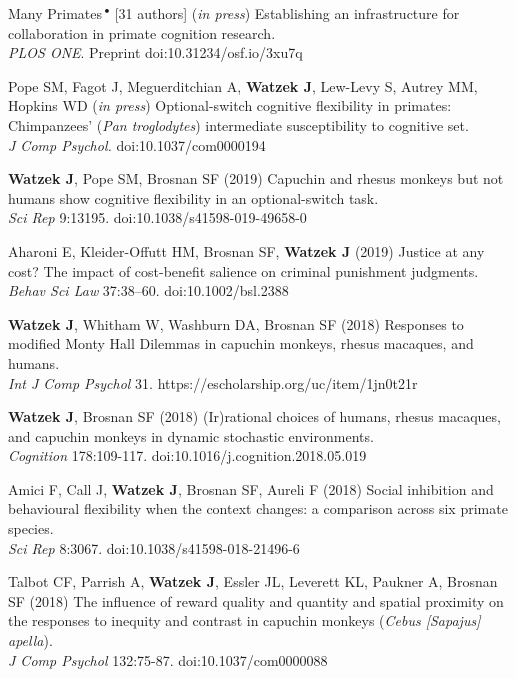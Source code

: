 \documentclass[]{friggeri-cv}
\begin{document}
\begin{enumerate}[label={[\,\arabic*\,]}]
  \item {Many Primates\,${}^\bullet$ [31 authors] (\emph{in press}) Establishing an infrastructure for collaboration in primate cognition research. \\\emph{PLOS ONE}. Preprint doi:10.31234/osf.io/3xu7q}
  \item {Pope SM, Fagot J, Meguerditchian A, \textbf{Watzek J}, Lew-Levy S, Autrey MM, Hopkins WD (\emph{in press}) Optional-switch cognitive flexibility in primates: Chimpanzees' (\emph{Pan troglodytes}) intermediate susceptibility to cognitive set. \\\emph{J Comp Psychol.} doi:10.1037/com0000194 }
  \item {\textbf{Watzek J}, Pope SM, Brosnan SF (2019) Capuchin and rhesus monkeys but not humans show cognitive flexibility in an optional-switch task. \\\emph{Sci Rep} 9:13195. doi:10.1038/s41598-019-49658-0}
  \item {Aharoni E, Kleider-Offutt HM, Brosnan SF, \textbf{Watzek J} (2019) Justice at any cost? The impact of cost-benefit salience on criminal punishment judgments. \\\emph{Behav Sci Law} 37:38–60. doi:10.1002/bsl.2388}
  \item {\textbf{Watzek J}, Whitham W, Washburn DA, Brosnan SF (2018) Responses to modified Monty Hall Dilemmas in capuchin monkeys, rhesus macaques, and humans. \\\emph{Int J Comp Psychol} 31. https://escholarship.org/uc/item/1jn0t21r}
  \item {\textbf{Watzek J}, Brosnan SF (2018) (Ir)rational choices of humans, rhesus macaques, and capuchin monkeys in dynamic stochastic environments. \\\emph{Cognition} 178:109-117. doi:10.1016/j.cognition.2018.05.019}
  \item {Amici F, Call J, \textbf{Watzek J}, Brosnan SF, Aureli F (2018) Social inhibition and behavioural flexibility when the context changes: a comparison across six primate species. \\\emph{Sci Rep} 8:3067. doi:10.1038/s41598-018-21496-6}
  \item {Talbot CF, Parrish A, \textbf{Watzek J}, Essler JL, Leverett KL, Paukner A, Brosnan SF (2018) The influence of reward quality and quantity and spatial proximity on the responses to inequity and contrast in capuchin monkeys (\emph{Cebus [Sapajus] apella}). \\\emph{J Comp Psychol} 132:75-87. doi:10.1037/com0000088}

\end{enumerate}
\end{document}
